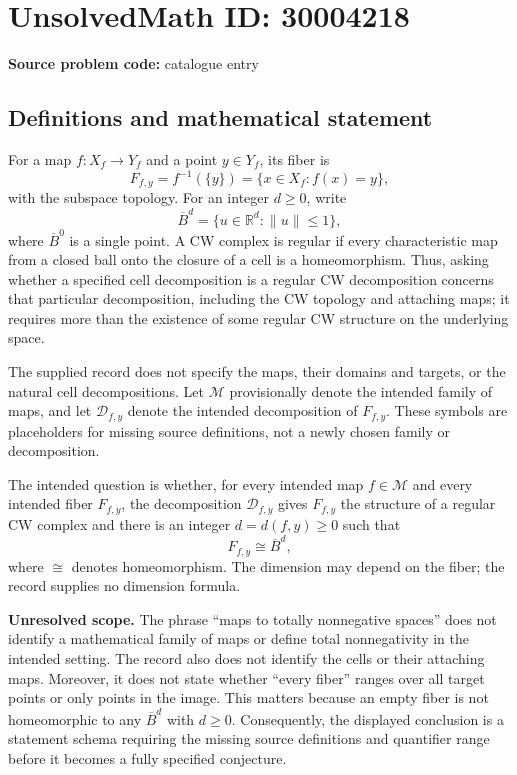 \documentclass[11pt]{article}
\newcommand{\R}{\mathbb{R}}
\begin{document}
\section*{UnsolvedMath ID: 30004218}
\textbf{Source problem code:} catalogue entry
\subsection{Definitions and mathematical statement}
For a map \(f:X_f\to Y_f\) and a point \(y\in Y_f\), its fiber is
\[
F_{f,y}=f^{-1}(\{y\})=\{x\in X_f:f(x)=y\},
\]
with the subspace topology. For an integer \(d\geq 0\), write
\[
\overline B^{d}=\{u\in\R^{d}:\|u\|\leq 1\},
\]
where \(\overline B^0\) is a single point. A CW complex is regular if every characteristic map from a closed ball onto the closure of a cell is a homeomorphism. Thus, asking whether a specified cell decomposition is a regular CW decomposition concerns that particular decomposition, including the CW topology and attaching maps; it requires more than the existence of some regular CW structure on the underlying space.

The supplied record does not specify the maps, their domains and targets, or the natural cell decompositions. Let \(\mathcal M\) provisionally denote the intended family of maps, and let \(\mathcal D_{f,y}\) denote the intended decomposition of \(F_{f,y}\). These symbols are placeholders for missing source definitions, not a newly chosen family or decomposition.

The intended question is whether, for every intended map \(f\in\mathcal M\) and every intended fiber \(F_{f,y}\), the decomposition \(\mathcal D_{f,y}\) gives \(F_{f,y}\) the structure of a regular CW complex and there is an integer \(d=d(f,y)\geq 0\) such that
\[
F_{f,y}\cong\overline B^{d},
\]
where \(\cong\) denotes homeomorphism. The dimension may depend on the fiber; the record supplies no dimension formula.

\textbf{Unresolved scope.} The phrase ``maps to totally nonnegative spaces'' does not identify a mathematical family of maps or define total nonnegativity in the intended setting. The record also does not identify the cells or their attaching maps. Moreover, it does not state whether ``every fiber'' ranges over all target points or only points in the image. This matters because an empty fiber is not homeomorphic to any \(\overline B^d\) with \(d\geq0\). Consequently, the displayed conclusion is a statement schema requiring the missing source definitions and quantifier range before it becomes a fully specified conjecture.
\end{document}
